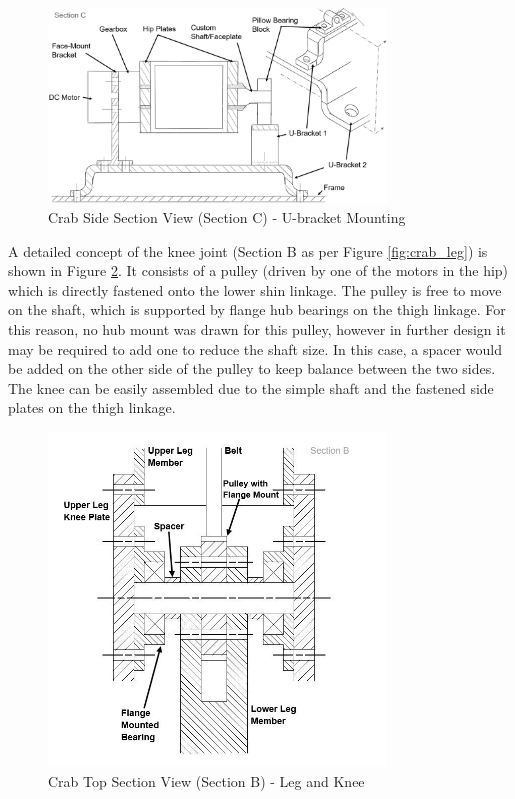 \begin{figure}[H]
    \centering
    \includegraphics[width=0.8\textwidth]{3_DesignConcepts/img/Crab/crab_hip_cut.png}
    \caption{Crab Side Section View (Section C) - U-bracket Mounting}
    \label{fig:crab_hip_cut}
\end{figure}

A detailed concept of the knee joint (Section B as per Figure \ref{fig:crab_leg}) is shown in Figure \ref{fig:crab_knee}. It consists of a pulley (driven by one of the motors in the hip) which is directly fastened onto the lower shin linkage. The pulley is free to move on the shaft, which is supported by flange hub bearings on the thigh linkage. For this reason, no hub mount was drawn for this pulley, however in further design it may be required to add one to reduce the shaft size. In this case, a spacer would be added on the other side of the pulley to keep balance between the two sides. The knee can be easily assembled due to the simple shaft and the fastened side plates on the thigh linkage. 

\begin{figure}[H]
    \centering
    \includegraphics[width=0.8\textwidth]{3_DesignConcepts/img/Crab/crab_knee.JPG}
    \caption{Crab Top Section View (Section B) - Leg and Knee}
    \label{fig:crab_knee}
\end{figure}

